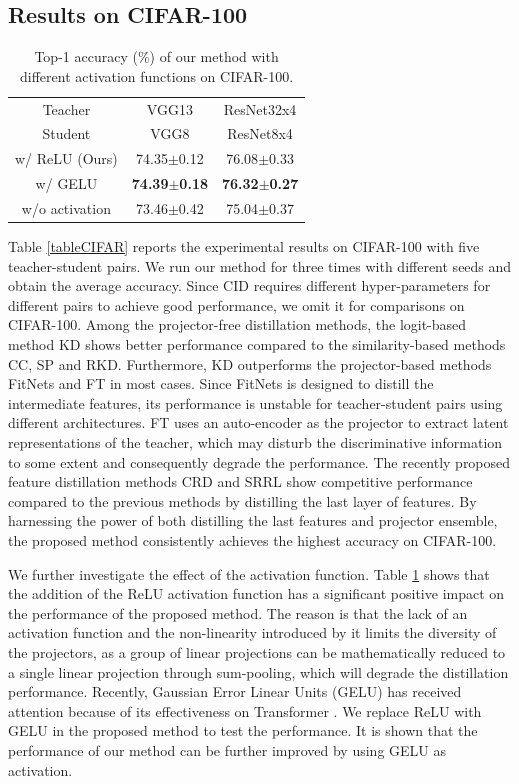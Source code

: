 \documentclass{article}
\begin{document}
\subsection{Results on CIFAR-100} \label{cifarsection}


\begin{table}
    \setlength{\abovecaptionskip}{-0.45cm}
    \setlength{\belowcaptionskip}{0.2cm}
    \caption{Top-1 accuracy ($\%$) of our method with different activation functions on CIFAR-100.}
    \label{activation}
    \centering
    \begin{tabular}{c|c|c} 
		\hline
		Teacher &VGG13 &{ResNet32x4} \\
		Student &VGG8 &{ResNet8x4} \\
		\hline 
		w/ ReLU (Ours) &74.35$\pm$0.12   &76.08$\pm$0.33\\
		w/ GELU &\textbf{74.39$\pm$0.18}   &\textbf{76.32$\pm$0.27}\\
		w/o activation &73.46$\pm$0.42  &75.04$\pm$0.37\\
		\hline
    \end{tabular}
\end{table}
Table \ref{tableCIFAR} reports the experimental results on CIFAR-100 with five teacher-student pairs. We run our method for three times with different seeds and obtain the average accuracy. Since CID requires different hyper-parameters for different pairs to achieve good performance, we omit it for comparisons on CIFAR-100. Among the projector-free distillation methods, the logit-based method KD shows better performance compared to the similarity-based methods CC, SP and RKD. Furthermore, KD outperforms the projector-based methods FitNets and FT in most cases. Since FitNets is designed to distill the intermediate features, its performance is unstable for teacher-student pairs using different architectures. FT uses an auto-encoder as the projector to extract latent representations of the teacher, which may disturb the discriminative information to some extent and consequently degrade the performance. The recently proposed feature distillation methods CRD and SRRL show competitive performance compared to the previous methods by distilling the last layer of features. By harnessing the power of both distilling the last features and projector ensemble, the proposed method consistently achieves the highest accuracy on CIFAR-100.


We further investigate the effect of the activation function. Table \ref{activation} shows that the addition of the ReLU activation function has a significant positive impact on the performance of the proposed method. The reason is that the lack of an activation function and the non-linearity introduced by it limits the diversity of the projectors, as a group of linear projections can be mathematically reduced to a single linear projection through sum-pooling, which will degrade the distillation performance. Recently, Gaussian Error Linear Units (GELU) \cite{gelu} has received attention because of its effectiveness on Transformer \cite{bert,vit}. We replace ReLU with GELU in the proposed method to test the performance. It is shown that the performance of our method can be further improved by using GELU as activation. 
\end{document}
